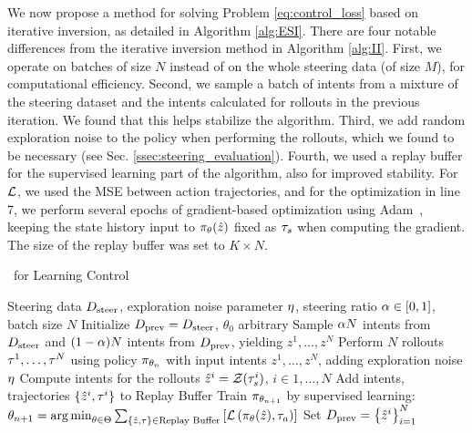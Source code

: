 \documentclass[nohyperref]{article}
\begin{document}
We now propose a method for solving Problem \eqref{eq:control_loss} based on iterative inversion, as detailed in Algorithm \ref{alg:ESI}. There are four notable differences from the iterative inversion method in Algorithm \ref{alg:II}. First, we operate on batches of size $N$ instead of on the whole steering data (of size $M$), for computational efficiency. Second, we sample a batch of intents from a mixture of the steering dataset and the intents calculated for rollouts in the previous iteration. We found that this helps stabilize the algorithm. Third, we add random exploration noise to the policy when performing the rollouts, which we found to be necessary (see Sec. \ref{ssec:steering_evaluation}). Fourth, we used a replay buffer for the supervised learning part of the algorithm, also for improved stability.
For $\mathcal{L}$, we used the MSE between action trajectories,
and for the optimization in line 7, %
we perform several epochs of gradient-based optimization using Adam~\citep{kingma2014adam}, keeping the state history input to $\pi_{\theta}(\hat{z})$ fixed as $\tau_{s}$ when computing the gradient. The size of the replay buffer was set to $K\times N$.

\begin{algorithm}[]
\caption{\methodnamefull\ for Learning Control}
\label{alg:ESI}
\begin{algorithmic}[1]
    \REQUIRE Steering data $D_{\mathrm{steer}}$, exploration noise parameter $\eta$, steering ratio $\alpha\in [0,1]$, batch size $N$
    \STATE Initialize $D_{\mathrm{prev}} = D_{\mathrm{steer}}$, $\theta_0$ arbitrary
        \STATE Sample $\alpha N$ intents from $D_{\mathrm{steer}}$ and $(1-\alpha) N$ intents from $D_{\mathrm{prev}}$, yielding $z^1,\dots,z^N$ 
        \STATE Perform $N$ rollouts $\tau^1,\dots,\tau^N$ using policy $\pi_{\theta_n}$ with input intents $z^1,\dots,z^N$, adding exploration noise $\eta$
        \STATE {} Compute intents for the rollouts $\hat{z}^i = \mathcal{Z} (\tau_{s}^i)$, $i\in1,\dots,N$ 
        \STATE Add intents, trajectories $\{\hat{z}^i, \tau^i\}$ to Replay Buffer
        \STATE {} Train $\pi_{\theta_{n+1}}$ by supervised learning: $\theta_{n+1} = \operatorname*{arg\,min}_{\theta \in \Theta} \sum_{\{\hat{z},\tau\}\in \textrm{Replay Buffer}}\left[ \mathcal{L}\left(\pi_{\theta}(\hat{z}), \tau_{a}\right) \right]$ 
        \STATE Set $D_{\mathrm{prev}} = \left\{ \hat{z}^i \right\}_{i=1}^{N} $
    \ENDFOR
\end{algorithmic}
\end{algorithm}
\end{document}
